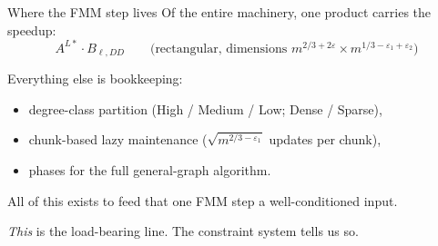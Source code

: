 \documentclass[aspectratio=169,10pt]{beamer}
\begin{document}
\begin{frame}{Where the FMM step lives}
  Of the entire machinery, \alert{one product} carries the speedup:
  \[
    A^{L*} \cdot B_{\ell, DD}
    \qquad \text{(rectangular, dimensions $m^{2/3+2\varepsilon} \times m^{1/3-\varepsilon_1+\varepsilon_2}$)}
  \]

  \vspace{0.5em}
  Everything else is bookkeeping:
  \begin{itemize}
    \item degree-class partition (High / Medium / Low; Dense / Sparse),
    \item chunk-based lazy maintenance ($\sqrt{m^{2/3-\varepsilon_1}}$ updates per chunk),
    \item phases for the full general-graph algorithm.
  \end{itemize}

  \vspace{0.4em}
  All of this exists \alert{to feed that one FMM step a well-conditioned input}.

  \vspace{0.4em}
  \emph{This} is the load-bearing line. The constraint system tells us so.
\end{frame}
\end{document}
